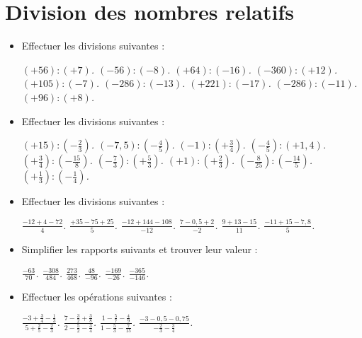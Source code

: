 \chapter{Division des nombres relatifs}

\begin{itemize}
\item Effectuer les divisions suivantes :
\begin{itemize}
\it $(+56):(+7)$.
\it $(-56):(-8)$.
\it $(+64):(-16)$.
\it $(-360):(+12)$.
\it $(+105):(-7)$. 
\it $(-286):(-13)$.
\it $(+221):(-17)$.
\it $(-286):(-11)$.
\it $(+96):(+8)$. 
\end{itemize} 
\item Effectuer les divisions suivantes : 
\begin{itemize}
\it $\displaystyle(+15):\left(-\frac23\right)$.
\it $\displaystyle(-7,5):\left(-\frac45\right)$.
\it $\displaystyle(-1):\left(+\frac34\right)$.
\it $\displaystyle\left(-\frac45\right):(+1,4)$.
\it $\displaystyle\left(+\frac34\right):\left(-\frac{15}8\right)$.
\it $\displaystyle\left(-\frac73\right):\left(+\frac53\right)$.
\it $\displaystyle(+1):\left(+\frac23\right)$.
\it $\displaystyle\left(-\frac{8}{25}\right):\left(-\frac{14}5\right)$.
\it $\displaystyle\left(+\frac13\right):\left(-\frac14\right)$.
\end{itemize}
\item Effectuer les divisions suivantes : 
\begin{itemize}
\it $\displaystyle\frac{-12+4-72}{4}$.
\it $\displaystyle\frac{+35-75+25}{5}$.
\it $\displaystyle\frac{-12+144-108}{-12}$.
\it $\displaystyle\frac{7-0,5+2}{-2}$. 
\it $\displaystyle\frac{9+13-15}{11}$.
\it $\displaystyle\frac{-11+15-7,8}5$. 
\end{itemize}
\item Simplifier les rapports suivants et trouver leur valeur : 
\begin{itemize}
\it $\displaystyle\frac{-63}{70}$.
\it $\displaystyle\frac{-308}{484}$.
\it $\displaystyle\frac{273}{468}$. 
\it $\displaystyle\frac{48}{-96}$.
\it $\displaystyle\frac{-169}{-26}$.
\it $\displaystyle\frac{-365}{-146}$.
\end{itemize}
\item Effectuer les opérations suivantes : 
\begin{itemize}
\it $\displaystyle\frac{-3+\frac34-\frac13}{5+\frac25-\frac23}$.
\it $\displaystyle\frac{7-\frac32+\frac38}{2-\frac52-\frac34}$.
\it $\displaystyle\frac{1-\frac57-\frac49}{1-\frac53-\frac7{15}}$.
\it $\displaystyle\frac{-3-0,5-0,75}{-\frac23-\frac34}$. 

\end{itemize}
\end{itemize}
